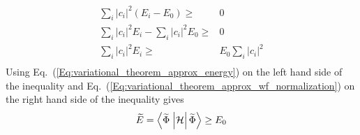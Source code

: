 \begin{hphproof}
\begin{equation*}
\begin{split}
    \sum_i{\left| c_i \right|^2 \left( E_i - E_0 \right)} \ge{}& 0   \\
    \sum_i{\left| c_i \right|^2 E_i} - \sum_i{\left| c_i \right|^2 E_0} \ge{}& 0   \\ 
    \sum_i{\left| c_i \right|^2 E_i} \ge{}& E_0 \sum_i{\left| c_i \right|^2}   \\ 
  \end{split}
\end{equation*}
%
Using Eq.~(\ref{Eq:variational_theorem_approx_energy}) on the left hand side of the inequality and Eq.~(\ref{Eq:variational_theorem_approx_wf_normalization}) on the right hand side of the inequality gives
%
\begin{equation*}
  \displaystyle
  \widetilde{E} = \braketop{\widetilde{\Phi}}{\mathcal{H}}{\widetilde{\Phi}} \ge{} E_0
\end{equation*}

\qedfilled

\end{hphproof}

%

